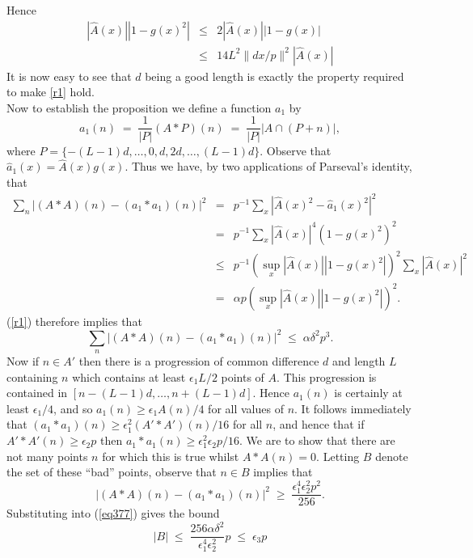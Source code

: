 \documentclass[a4paper,12pt]{article}
\begin{document}
     Hence
     \begin{eqnarray*}
      |\hat{A}(x) | |1 - g(x)^2 | & \leq  & 2 |\hat{A}(x) | |1 - g(x) | \\
      & \leq  & 14 L^2\| dx/p\|^2  |\hat{A}(x) |
    \end{eqnarray*}
 It is now easy to see that $d$ being a good length is exactly the property required to make \eqref{r1} hold.\\[11pt]
 Now to establish the proposition we define a function $a_1$ by
    \[a_1(n) \; = \;\frac{1}{|P|}(A\ast P)(n)\; =\;\frac{1}{ |P |} |A\cap(P
+ n) |,\]
     where $P =\{-(L-1)d,\dots,0,d,2d,\dots, (L-1)d\}$.
     Observe that $\hat{a}_1(x) = \hat{A}(x)g(x)$. Thus we have, by two applications of Parseval's identity, that
    \begin{eqnarray}
    \sum_n\left  |(A \ast A)(n) - (a_1 \ast a_1)(n)\right  |^2\nonumber & = & p^{-1}\sum_x\left  | \hat{A}(x)^2 - \hat{a}
_1(x)^2\right  |^2\\\nonumber & = & p^{-1}\sum_x  |\hat{A}(x) |^4\left(1 - g(x)^2\right )^2\\
&\nonumber\leq  & p^{-1}\left(\sup_x  |\hat{A}(x) | |1 - g(x)^2 |\right )^2\sum  _x  |\hat{A}(x) |^2\\
\label{inamin}& = &\alpha  p\left(\sup_x  |\hat{A}(x) | |1 - g(x)^2 |\right )^2.\end{eqnarray}
(\ref{r1}) therefore implies that
    \begin{equation}\label{eq377}
    \sum_n\left  |(A \ast A)(n) - (a_1 \ast a_1)(n)\right  |^2\;\leq \;\alpha \delta ^2 p^3.
    \end{equation}
     Now if $n\in A'$ then there is a progression of common difference $d$ and length $L$ containing $n$ which contains at least $\epsilon_1 L/2$
points of $A$. This progression is contained in $[n-(L-1)d,\dots, n+(L-1)d]$. Hence $a_1(n)$ is certainly at least $\epsilon_1/4$, and so $a
_1(n)\geq \epsilon_1 A(n)/4$ for all values of $n$. It follows immediately that $(a_1 \ast a_1)(n)\geq \epsilon_1^2 (A' \ast A')(n)/16$ for all $n$, and hence that if $A' \ast A'(n)\geq \epsilon_2 p$
then $a_1 \ast a_1(n)\geq
    \epsilon_1^2\epsilon_2 p/16$. We are to show that there are not many points $n$ for
which this is true whilst $A \ast A(n) = 0$. Letting $B$ denote the set of these
``bad'' points, observe that $n\in B$ implies that
     \[ \left  |(A \ast A)(n) - (a_1 \ast a_1)(n)\right  |^2 \; \geq  \;
\frac{\epsilon_1^4\epsilon_2^2p^2}{256}.\]
     Substituting into (\ref{eq377}) gives the bound
    \[  |B |\;\leq \;\frac{256\alpha \delta ^2}{\epsilon_1^4\epsilon_2^2} p\;\le \;\epsilon_3 p\]
\end{document}
